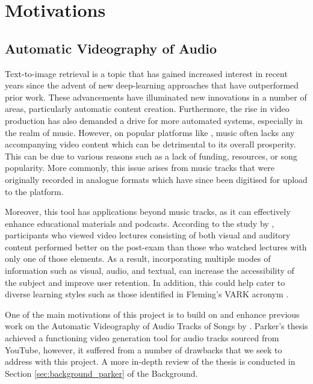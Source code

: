 \documentclass{l4proj}
\begin{document}
\section{Motivations}
\subsection{Automatic Videography of Audio}
Text-to-image retrieval is a topic that has gained increased interest in recent years since the advent of new deep-learning approaches that have outperformed prior work. These advancements have illuminated new innovations in a number of areas, particularly automatic content creation. Furthermore, the rise in video production \citep{tprisevideo} has also demanded a drive for more automated systems, especially in the realm of music. However, on popular platforms like \cite{youtube}, music often lacks any accompanying video content which can be detrimental to its overall prosperity. This can be due to various reasons such as a lack of funding, resources, or song popularity. More commonly, this issue arises from music tracks that were originally recorded in analogue formats which have since been digitised for upload to the platform.

Moreover, this tool has applications beyond music tracks, as it can effectively enhance educational materials and podcasts. According to the study by \cite{benefits_of_mmv}, participants who viewed video lectures consisting of both visual and auditory content performed better on the post-exam than those who watched lectures with only one of those elements. As a result, incorporating multiple modes of information such as visual, audio, and textual, can increase the accessibility of the subject and improve user retention. In addition, this could help cater to diverse learning styles such as those identified in Fleming's VARK acronym \citep{vark}.

One of the main motivations of this project is to build on and enhance previous work on the Automatic Videography of Audio Tracks of Songs by \cite{parker}. Parker's thesis achieved a functioning video generation tool for audio tracks sourced from YouTube, however, it suffered from a number of drawbacks that we seek to address with this project. A more in-depth review of the thesis is conducted in Section \ref{sec:background_parker} of the Background.
\end{document}
